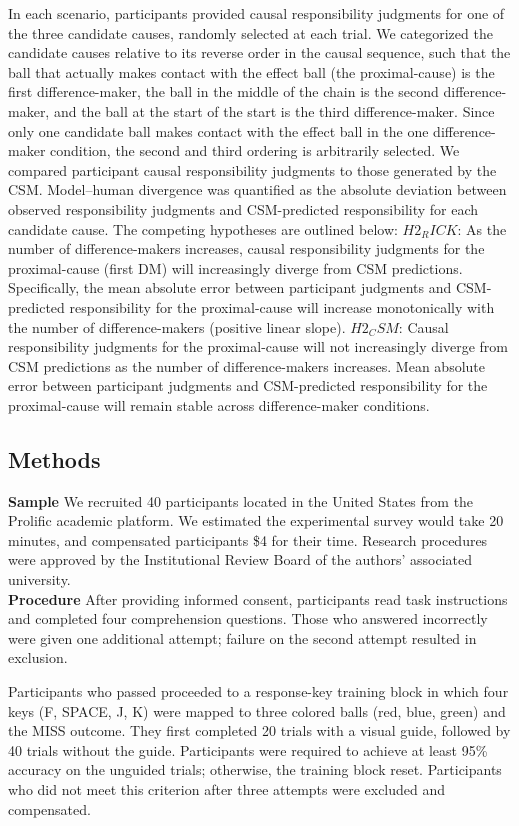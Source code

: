 \documentclass[10pt,letterpaper]{article}
\begin{document}
In each scenario, participants provided causal responsibility judgments for one of the three candidate causes, randomly selected at each trial. We categorized the candidate causes relative to its reverse order in the causal sequence, such that the ball that actually makes contact with the effect ball (the proximal-cause) is the first difference-maker, the ball in the middle of the chain is the second difference-maker, and the ball at the start of the start is the third difference-maker. Since only one candidate ball makes contact with the effect ball in the one difference-maker condition, the second and third ordering is arbitrarily selected.
We compared participant causal responsibility judgments to those generated by the CSM. Model–human divergence was quantified as the absolute deviation between observed responsibility judgments and CSM-predicted responsibility for each candidate cause. The competing hypotheses are outlined below:
$H2_RICK$: As the number of difference-makers increases, causal responsibility judgments for the proximal-cause (first DM) will increasingly diverge from CSM predictions. Specifically, the mean absolute error between participant judgments and CSM-predicted responsibility for the proximal-cause will increase monotonically with the number of difference-makers (positive linear slope).
$H2_CSM$: Causal responsibility judgments for the proximal-cause will not increasingly diverge from CSM predictions as the number of difference-makers increases. Mean absolute error between participant judgments and CSM-predicted responsibility for the proximal-cause will remain stable across difference-maker conditions.

\subsection{Methods}

\textbf{Sample} We recruited 40 participants located in the United States from the Prolific academic platform. We estimated the experimental survey would take 20 minutes, and compensated participants \$4 for their time. Research procedures were approved by the Institutional Review Board of the authors’ associated university. \\
\textbf{Procedure} After providing informed consent, participants read task instructions and completed four comprehension questions. Those who answered incorrectly were given one additional attempt; failure on the second attempt resulted in exclusion.

Participants who passed proceeded to a response-key training block in which four keys (F, SPACE, J, K) were mapped to three colored balls (red, blue, green) and the MISS outcome. They first completed 20 trials with a visual guide, followed by 40 trials without the guide. Participants were required to achieve at least 95\% accuracy on the unguided trials; otherwise, the training block reset. Participants who did not meet this criterion after three attempts were excluded and compensated.
\end{document}
